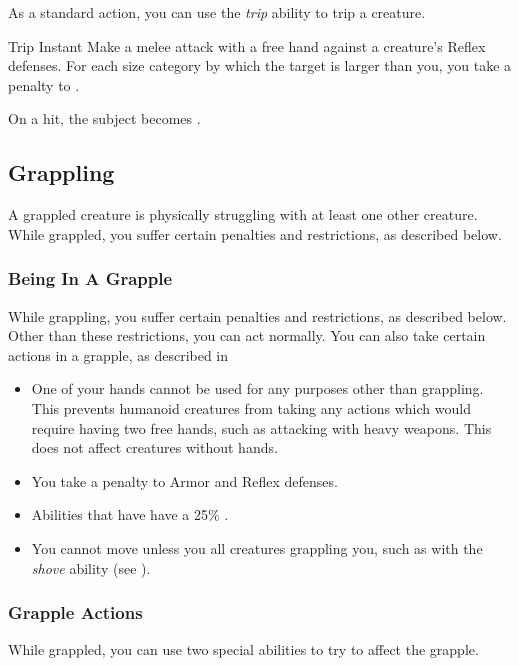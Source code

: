          As a standard action, you can use the \textit{trip} ability to trip a creature.

        \begin{instantability}{Trip}
            \label{Trip}
            Instant
            \rankline
            Make a melee attack with a free hand against a creature's Reflex defenses.
            For each size category by which the target is larger than you, you take a  penalty to .

            On a hit, the subject becomes \prone.
        \end{instantability}

    \subsection{Grappling}\label{Grappling}
        A grappled creature is physically struggling with at least one other creature.
        While grappled, you suffer certain penalties and restrictions, as described below.

        \subsubsection{Being In A Grapple}
            While grappling, you suffer certain penalties and restrictions, as described below. Other than these restrictions, you can act normally. You can also take certain actions in a grapple, as described in 
            \begin{itemize}
                \item One of your hands cannot be used for any purposes other than grappling.
                    This prevents humanoid creatures from taking any actions which would require having two free hands, such as attacking with heavy weapons.
                    This does not affect creatures without hands.
                \item You take a  penalty to Armor and Reflex defenses.
                \item Abilities that have  have a 25\% .
                \item You cannot move unless you  all creatures grappling you, such as with the \textit{shove} ability (see ).
            \end{itemize}

        \subsubsection{Grapple Actions}\label{Grapple Actions}
            While grappled, you can use two special abilities to try to affect the grapple.

